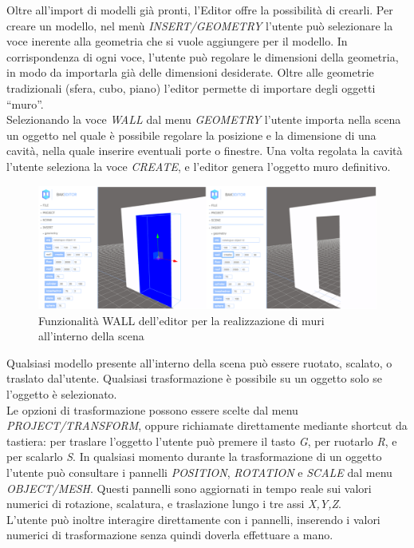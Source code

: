 Oltre all’import di modelli già pronti, l’Editor offre la possibilità di crearli. Per creare un modello, nel menù \emph{INSERT/GEOMETRY} l’utente può selezionare la voce inerente alla geometria che si vuole aggiungere per il modello. In corrispondenza di ogni voce, l’utente può regolare le dimensioni della geometria, in modo da importarla già delle dimensioni desiderate.
Oltre alle geometrie tradizionali (sfera, cubo, piano) l’editor permette di importare degli oggetti “muro”.
\\
Selezionando la voce \emph{WALL} dal menu \emph{GEOMETRY} l’utente importa nella scena un oggetto nel quale è possibile regolare la posizione e la dimensione di una cavità, nella quale inserire eventuali porte o finestre. Una volta regolata la cavità l’utente seleziona la voce \emph{CREATE}, e l’editor genera l’oggetto muro definitivo.
\\
\begin{figure}[htb]
 \centering
 \includegraphics[width=1\linewidth]{images/chapter_caso_uso/caso_uso_muri.png}\hfill
 \caption[Costruzione muri]{Funzionalità WALL dell'editor per la realizzazione di muri all'interno della scena}
 \label{fig:caso_uso_muri}
\end{figure}
Qualsiasi modello presente all’interno della scena può essere ruotato, scalato, o traslato dal’utente. Qualsiasi trasformazione è possibile su un oggetto solo se l’oggetto è selezionato.
\\
Le opzioni di trasformazione possono essere scelte dal menu \emph{PROJECT/TRANSFORM}, oppure richiamate direttamente mediante shortcut da tastiera: per traslare l’oggetto l’utente può premere il tasto \emph{G}, per ruotarlo \emph{R}, e per scalarlo \emph{S}. In qualsiasi momento durante la trasformazione di un oggetto l’utente può consultare i pannelli \emph{POSITION}, \emph{ROTATION} e \emph{SCALE} dal menu \emph{OBJECT/MESH}. Questi pannelli sono aggiornati in tempo reale sui valori numerici di rotazione, scalatura, e traslazione lungo i tre assi \emph{X,Y,Z}. 
\\
L’utente può inoltre interagire direttamente con i pannelli, inserendo i valori numerici di trasformazione senza quindi doverla effettuare a mano.
